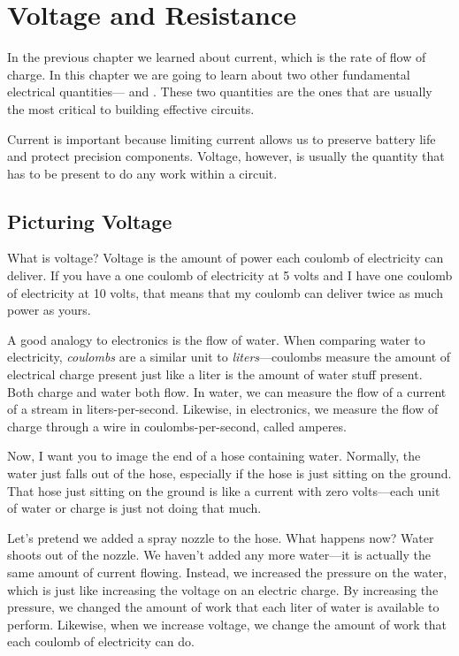 \chapter{Voltage and Resistance}

In the previous chapter we learned about current, which is the rate of flow of charge.
In this chapter we are going to learn about two other fundamental electrical quantities--- and .
These two quantities are the ones that are usually the most critical to building effective circuits.

Current is important because limiting current allows us to preserve battery life and protect precision components.
Voltage, however, is usually the quantity that has to be present to do any work within a circuit.

\section{Picturing Voltage}

What is voltage?
Voltage is the amount of power each coulomb of electricity can deliver.
If you have a one coulomb of electricity at 5 volts and I have one coulomb of electricity at 10 volts, that means that my coulomb can deliver twice as much power as yours.

A good analogy to electronics is the flow of water.
When comparing water to electricity, \emph{coulombs} are a similar unit to \emph{liters}---coulombs measure the amount of electrical charge present just like a liter is the amount of water stuff present.
Both charge and water both flow.
In water, we can measure the flow of a current of a stream in liters-per-second.
Likewise, in electronics, we measure the flow of charge through a wire in coulombs-per-second, called amperes.

Now, I want you to image the end of a hose containing water.
Normally, the water just falls out of the hose, especially if the hose is just sitting on the ground.
That hose just sitting on the ground is like a current with zero volts---each unit of water or charge is just not doing that much.

Let's pretend we added a spray nozzle to the hose.
What happens now?
Water shoots out of the nozzle.
We haven't added any more water---it is actually the same amount of current flowing.
Instead, we increased the pressure on the water, which is just like increasing the voltage on an electric charge.
By increasing the pressure, we changed the amount of work that each liter of water is available to perform.
Likewise, when we increase voltage, we change the amount of work that each coulomb of electricity can do.

